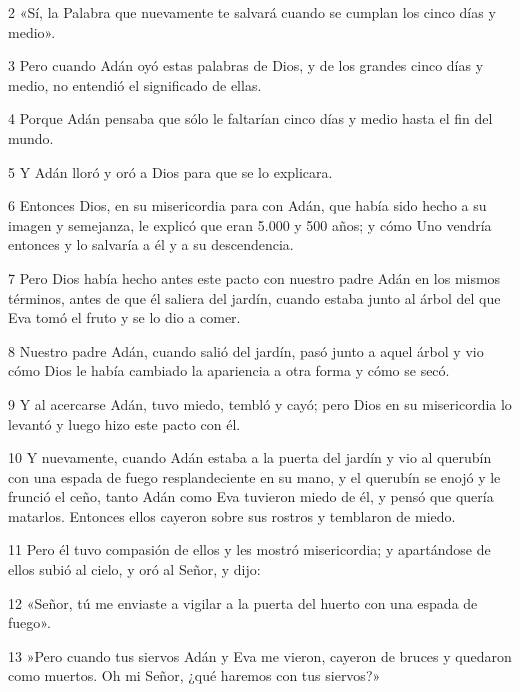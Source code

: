 \par 2 «Sí, la Palabra que nuevamente te salvará cuando se cumplan los cinco días y medio».

\par 3 Pero cuando Adán oyó estas palabras de Dios, y de los grandes cinco días y medio, no entendió el significado de ellas.

\par 4 Porque Adán pensaba que sólo le faltarían cinco días y medio hasta el fin del mundo.

\par 5 Y Adán lloró y oró a Dios para que se lo explicara.

\par 6 Entonces Dios, en su misericordia para con Adán, que había sido hecho a su imagen y semejanza, le explicó que eran 5.000 y 500 años; y cómo Uno vendría entonces y lo salvaría a él y a su descendencia.

\par 7 Pero Dios había hecho antes este pacto con nuestro padre Adán en los mismos términos, antes de que él saliera del jardín, cuando estaba junto al árbol del que Eva tomó el fruto y se lo dio a comer.

\par 8 Nuestro padre Adán, cuando salió del jardín, pasó junto a aquel árbol y vio cómo Dios le había cambiado la apariencia a otra forma y cómo se secó.

\par 9 Y al acercarse Adán, tuvo miedo, tembló y cayó; pero Dios en su misericordia lo levantó y luego hizo este pacto con él.

\par 10 Y nuevamente, cuando Adán estaba a la puerta del jardín y vio al querubín con una espada de fuego resplandeciente en su mano, y el querubín se enojó y le frunció el ceño, tanto Adán como Eva tuvieron miedo de él, y pensó que quería matarlos. Entonces ellos cayeron sobre sus rostros y temblaron de miedo.

\par 11 Pero él tuvo compasión de ellos y les mostró misericordia; y apartándose de ellos subió al cielo, y oró al Señor, y dijo:

\par 12 «Señor, tú me enviaste a vigilar a la puerta del huerto con una espada de fuego».

\par 13 »Pero cuando tus siervos Adán y Eva me vieron, cayeron de bruces y quedaron como muertos. Oh mi Señor, ¿qué haremos con tus siervos?»


